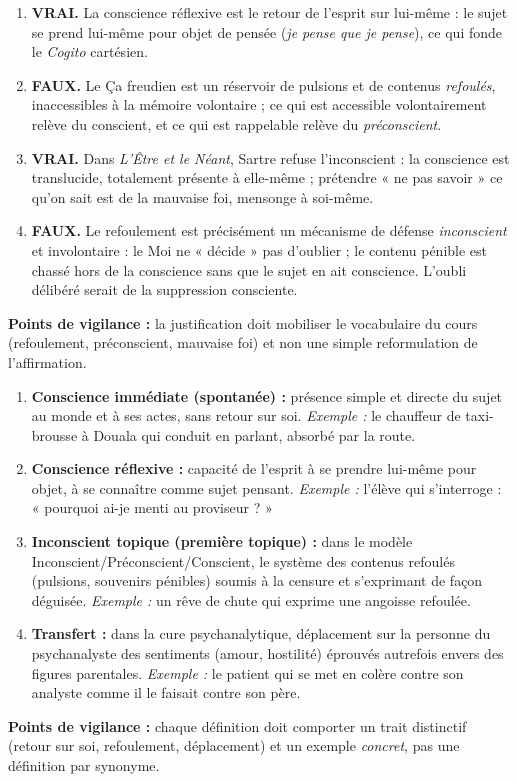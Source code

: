 \documentclass[11pt]{article}
\newcommand{\cle}[1]{{\popxbold\color{popdark}#1}}
\begin{document}
\begin{corrige}
\begin{enumerate}
    \item \textbf{VRAI.} La \cle{conscience réflexive} est le retour de l'esprit sur lui-même : le sujet se prend lui-même pour objet de pensée (\emph{je pense que je pense}), ce qui fonde le \emph{Cogito} cartésien.
    \item \textbf{FAUX.} Le Ça freudien est un réservoir de pulsions et de contenus \emph{refoulés}, inaccessibles à la mémoire volontaire ; ce qui est accessible volontairement relève du conscient, et ce qui est rappelable relève du \emph{préconscient}.
    \item \textbf{VRAI.} Dans \emph{L'Être et le Néant}, Sartre refuse l'inconscient : la conscience est translucide, totalement présente à elle-même ; prétendre « ne pas savoir » ce qu'on sait est de la \cle{mauvaise foi}, mensonge à soi-même.
    \item \textbf{FAUX.} Le \cle{refoulement} est précisément un mécanisme de défense \emph{inconscient} et involontaire : le Moi ne « décide » pas d'oublier ; le contenu pénible est chassé hors de la conscience sans que le sujet en ait conscience. L'oubli délibéré serait de la suppression consciente.
\end{enumerate}
\textbf{Points de vigilance :} la justification doit mobiliser le vocabulaire du cours (refoulement, préconscient, mauvaise foi) et non une simple reformulation de l'affirmation.
\end{corrige}

\begin{corrige}
\begin{enumerate}
    \item \textbf{Conscience immédiate (spontanée) :} présence simple et directe du sujet au monde et à ses actes, sans retour sur soi. \emph{Exemple :} le chauffeur de taxi-brousse à Douala qui conduit en parlant, absorbé par la route.
    \item \textbf{Conscience réflexive :} capacité de l'esprit à se prendre lui-même pour objet, à se connaître comme sujet pensant. \emph{Exemple :} l'élève qui s'interroge : « pourquoi ai-je menti au proviseur ? »
    \item \textbf{Inconscient topique (première topique) :} dans le modèle Inconscient/Préconscient/Conscient, le système des contenus refoulés (pulsions, souvenirs pénibles) soumis à la censure et s'exprimant de façon déguisée. \emph{Exemple :} un rêve de chute qui exprime une angoisse refoulée.
    \item \textbf{Transfert :} dans la cure psychanalytique, déplacement sur la personne du psychanalyste des sentiments (amour, hostilité) éprouvés autrefois envers des figures parentales. \emph{Exemple :} le patient qui se met en colère contre son analyste comme il le faisait contre son père.
\end{enumerate}
\textbf{Points de vigilance :} chaque définition doit comporter un trait distinctif (retour sur soi, refoulement, déplacement) et un exemple \emph{concret}, pas une définition par synonyme.
\end{corrige}
\end{document}
